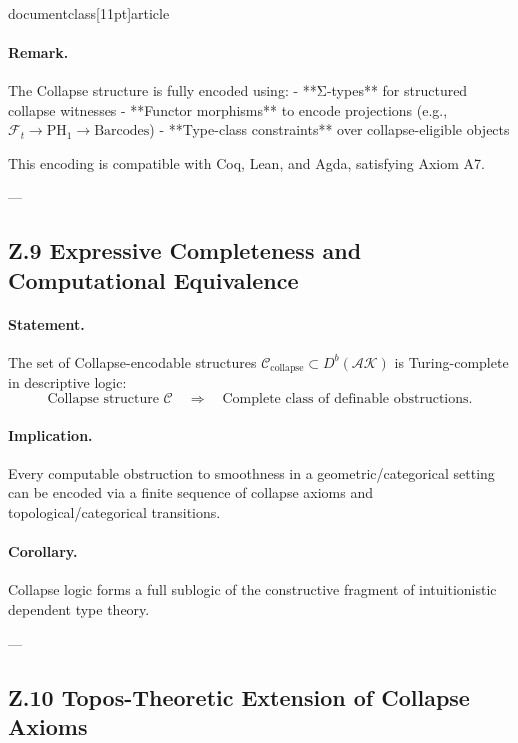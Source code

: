 \\documentclass[11pt]{article}
\begin{document}
\paragraph{Remark.}
The Collapse structure is fully encoded using:
- **Σ-types** for structured collapse witnesses
- **Functor morphisms** to encode projections (e.g., \( \mathcal{F}_t \to \mathrm{PH}_1 \to \text{Barcodes} \))
- **Type-class constraints** over collapse-eligible objects

This encoding is compatible with Coq, Lean, and Agda, satisfying Axiom A7.

---

\subsection*{Z.9 Expressive Completeness and Computational Equivalence}

\paragraph{Statement.}
The set of Collapse-encodable structures \( \mathcal{C}_{\text{collapse}} \subset D^b(\mathcal{AK}) \) is Turing-complete in descriptive logic:
\[
\text{Collapse structure } \mathcal{C} \quad \Longrightarrow \quad \text{Complete class of definable obstructions}.
\]

\paragraph{Implication.}
Every computable obstruction to smoothness in a geometric/categorical setting  
can be encoded via a finite sequence of collapse axioms and topological/categorical transitions.

\paragraph{Corollary.}
Collapse logic forms a full sublogic of the constructive fragment of intuitionistic dependent type theory.

---

\subsection*{Z.10 Topos-Theoretic Extension of Collapse Axioms}
\end{document}

